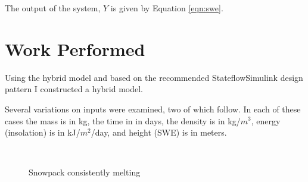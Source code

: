 \documentclass{article}
\begin{document}
The output of the system, $Y$ is given by Equation \ref{eqn:swe}.


\section{Work Performed}

Using the hybrid model and based on the recommended
Stateflow\textregistered Simulink\textregistered
design pattern \citep{matlab2009ssdp} I constructed a
hybrid model.

Several variations on inputs were examined, two of which follow.
In each of these cases the mass is in kg, the time in in days,
the density is in kg/$m^3$, energy (insolation) is in
kJ/$m^2$/day, and height (SWE) is in meters.

\begin{figure}
\centering
\mbox{
 \quad
{}
}
\caption{Snowpack consistently melting} \label{fig:consistent-melting}
\end{figure}
\end{document}
